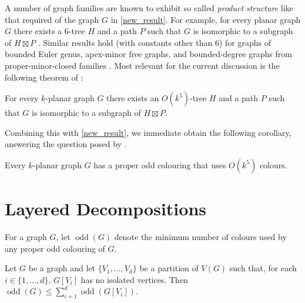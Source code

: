 \documentclass{patmorin}
\DeclareMathOperator{\odd}{odd}
\begin{document}
A number of graph families are known to exhibit so called \emph{product structure} like that required of the graph $G$ in \cref{new_result}.  For example, for every planar graph $G$ there exists a $6$-tree $H$ and a path $P$ such that $G$ is isomorphic to a subgraph of $H\boxtimes P$ \cite{ueckerdt.wood.ea:improved}.  Similar results hold (with constants other than $6$) for graphs of bounded Euler genus, apex-minor free graphs, and bounded-degree graphs from proper-minor-closed families \cite{dujmovic.joret.ea:planar,dujmovic.esperet.ea:clustered}.  Most relevant for the current discussion is the following theorem of \citet{dujmovic.morin.ea:structure}:

\begin{thm}\label{k_planar}
  For every $k$-planar graph $G$ there exists an $O(k^5)$-tree $H$ and a path $P$ such that $G$ is isomorphic to a subgraph of $H\boxtimes P$.
\end{thm}

Combining this with \cref{new_result}, we immediate obtain the following corollary, answering the question posed by \citet{cranston.lafferty.ea:note}.

\begin{cor}
  Every $k$-planar graph $G$ has a proper odd colouring that uses $O(k^5)$ colours.
\end{cor}



\section{Layered Decompositions}

For a graph $G$, let $\odd(G)$ denote the minimum number of colours used by any proper odd colouring of $G$.

\begin{obs}
  Let $G$ be a graph and let $\{V_1,\ldots,V_d\}$ be a partition of $V(G)$ such that, for each $i\in\{1,\ldots,d\}$, $G[V_i]$ has no isolated vertices.  Then $\odd(G) \le \sum_{i=1}^d \odd(G[V_i])$.
\end{obs}
\end{document}
